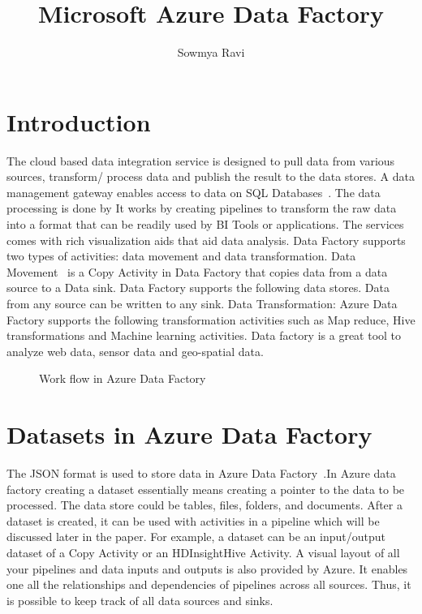 \documentclass[9pt,twocolumn,twoside]{styles/osajnl}
\title{Microsoft Azure Data Factory}
\author[1]{Sowmya Ravi}
\affil[1]{School of Informatics and Computing, Bloomington, IN 47408, U.S.A.}
\affil[*]{Corresponding authors: laszewski@gmail.com}
\begin{document}
\maketitle

\section{Introduction}
The cloud based data integration service is designed to pull data from various sources, transform/ process data and publish the result to the data stores. A data management gateway enables access to data on SQL Databases~\cite{www-jamesserra}. The data processing is done by It works by creating pipelines to  transform the raw data into a format that can be readily used by BI Tools or applications. The services comes with rich visualization aids that aid data analysis. Data Factory supports two types of activities: data movement  and data transformation. Data Movement~\cite{www-microsoft-azure} is a Copy Activity in Data Factory that copies data from a data source to a Data sink. Data Factory supports the following data stores. Data from any source can be written to any sink.  Data Transformation:  Azure Data Factory supports the following transformation activities such as Map reduce, Hive transformations and Machine learning activities.
Data factory is a great tool to analyze web data, sensor data and geo-spatial data.	
\begin{figure}[htbp]
\centering
{}
\caption{Work flow in Azure Data Factory}
\label{fig:copy-local}
\end{figure}


\section{Datasets in Azure Data Factory}

The JSON format is used to store data in Azure Data Factory~\cite{www-microsoft-azure-data}.In Azure data factory creating a dataset essentially means creating a pointer to the data to be processed.
The data store could be tables, files, folders, and documents. After a dataset is created, it can be used with activities in a pipeline which will be discussed later in the paper. For example, a dataset can be an input/output dataset of a Copy Activity or an HDInsightHive Activity. A visual layout of all your pipelines and data inputs and outputs is also provided by Azure. It enables one all the relationships and dependencies of  pipelines across all sources. Thus, it is possible to keep track of all data sources and sinks.
\end{document}
